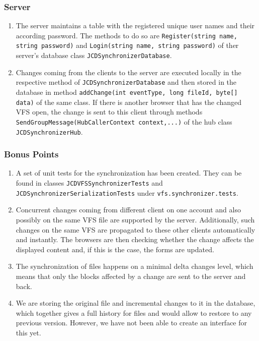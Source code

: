 \documentclass[a4paper,12pt]{article}
\begin{document}
\subsubsection{Server}
\begin{enumerate}
	\item The server maintains a table with the registered unique user names and their according password. The methods to do so are \texttt{Register(string name, string password)} and \texttt{Login(string name, string password)} of ther server's database class \texttt{JCDSynchronizerDatabase}.
	\item Changes coming from the clients to the server are executed locally in the respective method of \texttt{JCDSynchronizerDatabase} and then stored in the database in method \texttt{addChange(int eventType, long fileId, byte[] data)} of the same class. If there is another browser that has the changed VFS open, the change is sent to this client through methods \texttt{SendGroupMessage(HubCallerContext context,...)} of the hub class \texttt{JCDSynchronizerHub}.
	\end{enumerate}

	\subsubsection{Bonus Points}
	\begin{enumerate}
	\item A set of unit tests for the synchronization has been created. They can be found in classes \texttt{JCDVFSSynchronizerTests} and \newline
	\texttt{JCDSynchronizerSerializationTests} under \texttt{vfs.synchronizer.tests}.
	\item Concurrent changes coming from different client on one account and also possibly on the same VFS file are supported by the server. Additionally, such changes on the same VFS are propagated to these other clients automatically and instantly. The browsers are then checking whether the change affects the displayed content and, if this is the case, the forms are updated.
	\item The synchronization of files happens on a minimal delta changes level, which means that only the blocks affected by a change are sent to the server and back.
	\item We are storing the original file and incremental changes to it in the database, which together gives a full history for files and would allow to restore to any previous version. However, we have not been able to create an interface for this yet.
	\end{enumerate}
\end{document}
